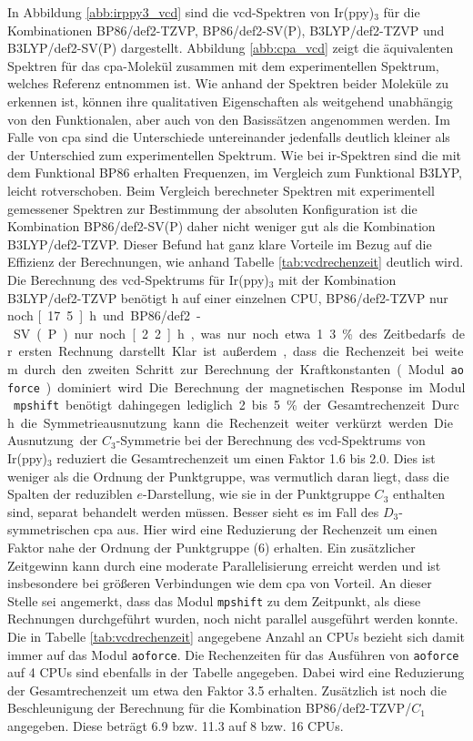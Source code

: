 In Abbildung \ref{abb:irppy3_vcd} sind die \ac{vcd}-Spektren von Ir(ppy)$_3$ für die Kombinationen BP86/def2-TZVP, BP86/def2-SV(P), B3LYP/def2-TZVP und B3LYP/def2-SV(P) dargestellt. Abbildung \ref{abb:cpa_vcd} zeigt die äquivalenten Spektren für das \ac{cpa}-Molekül zusammen mit dem experimentellen Spektrum, welches Referenz \cite{brotin2006vibrational} entnommen ist. Wie anhand der Spektren beider Moleküle zu erkennen ist, können ihre qualitativen Eigenschaften als weitgehend unabhängig von den Funktionalen, aber auch von den Basissätzen angenommen werden. Im Falle von \ac{cpa} sind die Unterschiede untereinander jedenfalls deutlich kleiner als der Unterschied zum experimentellen Spektrum. Wie bei \ac{ir}-Spektren sind die mit dem Funktional BP86 erhalten Frequenzen, im Vergleich zum Funktional B3LYP, leicht rotverschoben. Beim Vergleich berechneter Spektren mit experimentell gemessener Spektren zur Bestimmung der absoluten Konfiguration ist die Kombination BP86/def2-SV(P) daher nicht weniger gut als die Kombination B3LYP/def2-TZVP. Dieser Befund hat ganz klare Vorteile im Bezug auf die Effizienz der Berechnungen, wie anhand Tabelle \ref{tab:vcdrechenzeit} deutlich wird. Die Berechnung des \ac{vcd}-Spektrums für Ir(ppy)$_3$ mit der Kombination B3LYP/def2-TZVP benötigt \unit[166]{h} auf einer einzelnen CPU, BP86/def2-TZVP nur noch \unit[17.5]{h} und BP86/def2-SV(P) nur noch \unit[2.2]{h}, was nur noch etwa 1.3 \% des Zeitbedarfs der ersten Rechnung darstellt. Klar ist außerdem, dass die Rechenzeit bei weitem durch den zweiten Schritt zur Berechnung der Kraftkonstanten (Modul \texttt{aoforce}) dominiert wird. Die Berechnung der magnetischen Response im Modul \texttt{mpshift} benötigt dahingegen lediglich 2 bis 5 \% der Gesamtrechenzeit. 

Durch die Symmetrieausnutzung kann die Rechenzeit weiter verkürzt werden. Die Ausnutzung der $C_3$-Symmetrie bei der Berechnung des \ac{vcd}-Spektrums von Ir(ppy)$_3$ reduziert die Gesamtrechenzeit um einen Faktor 1.6 bis 2.0. Dies ist weniger als die Ordnung der Punktgruppe, was vermutlich daran liegt, dass die Spalten der reduziblen $e$-Darstellung, wie sie in der Punktgruppe $C_3$ enthalten sind, separat behandelt werden müssen. Besser sieht es im Fall des $D_3$-symmetrischen \ac{cpa} aus. Hier wird eine Reduzierung der Rechenzeit um einen Faktor nahe der Ordnung der Punktgruppe (6) erhalten. Ein zusätzlicher Zeitgewinn kann durch eine moderate Parallelisierung erreicht werden und ist insbesondere bei größeren Verbindungen wie dem \ac{cpa} von Vorteil. An dieser Stelle sei angemerkt, dass das Modul \texttt{mpshift} zu dem Zeitpunkt, als diese Rechnungen durchgeführt wurden, noch nicht parallel ausgeführt werden konnte. Die in Tabelle \ref{tab:vcdrechenzeit} angegebene Anzahl an CPUs bezieht sich damit immer auf das Modul \texttt{aoforce}. Die Rechenzeiten für das Ausführen von \texttt{aoforce} auf 4 CPUs sind ebenfalls in der Tabelle angegeben. Dabei wird eine Reduzierung der Gesamtrechenzeit um etwa den Faktor 3.5 erhalten. Zusätzlich ist noch die Beschleunigung der Berechnung für die Kombination BP86/def2-TZVP/$C_1$ angegeben. Diese beträgt 6.9 bzw. 11.3 auf 8 bzw. 16 CPUs.

